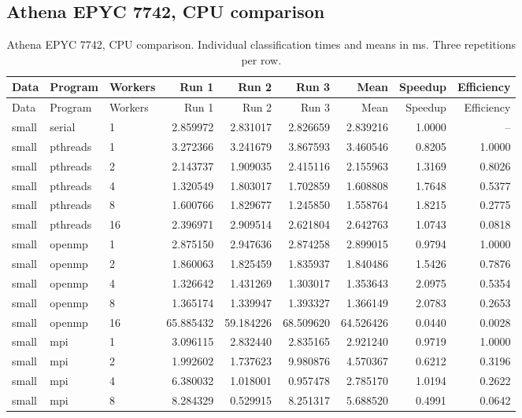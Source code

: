 \subsection{Athena EPYC 7742, CPU comparison}
\small
\begin{longtable}{lllrrrrrr}
\caption{Athena EPYC 7742, CPU comparison. Individual classification times and means in ms. Three repetitions per row.}\\
\toprule
Data & Program & Workers & Run 1 & Run 2 & Run 3 & Mean & Speedup & Efficiency \\
\midrule\endfirsthead
\toprule
Data & Program & Workers & Run 1 & Run 2 & Run 3 & Mean & Speedup & Efficiency \\
\midrule\endhead
\bottomrule\endfoot
small & serial & 1 & 2.859972 & 2.831017 & 2.826659 & 2.839216 & 1.0000 & -- \\
small & pthreads & 1 & 3.272366 & 3.241679 & 3.867593 & 3.460546 & 0.8205 & 1.0000 \\
small & pthreads & 2 & 2.143737 & 1.909035 & 2.415116 & 2.155963 & 1.3169 & 0.8026 \\
small & pthreads & 4 & 1.320549 & 1.803017 & 1.702859 & 1.608808 & 1.7648 & 0.5377 \\
small & pthreads & 8 & 1.600766 & 1.829677 & 1.245850 & 1.558764 & 1.8215 & 0.2775 \\
small & pthreads & 16 & 2.396971 & 2.909514 & 2.621804 & 2.642763 & 1.0743 & 0.0818 \\
small & openmp & 1 & 2.875150 & 2.947636 & 2.874258 & 2.899015 & 0.9794 & 1.0000 \\
small & openmp & 2 & 1.860063 & 1.825459 & 1.835937 & 1.840486 & 1.5426 & 0.7876 \\
small & openmp & 4 & 1.326642 & 1.431269 & 1.303017 & 1.353643 & 2.0975 & 0.5354 \\
small & openmp & 8 & 1.365174 & 1.339947 & 1.393327 & 1.366149 & 2.0783 & 0.2653 \\
small & openmp & 16 & 65.885432 & 59.184226 & 68.509620 & 64.526426 & 0.0440 & 0.0028 \\
small & mpi & 1 & 3.096115 & 2.832440 & 2.835165 & 2.921240 & 0.9719 & 1.0000 \\
small & mpi & 2 & 1.992602 & 1.737623 & 9.980876 & 4.570367 & 0.6212 & 0.3196 \\
small & mpi & 4 & 6.380032 & 1.018001 & 0.957478 & 2.785170 & 1.0194 & 0.2622 \\
small & mpi & 8 & 8.284329 & 0.529915 & 8.251317 & 5.688520 & 0.4991 & 0.0642 \\

\end{longtable}
